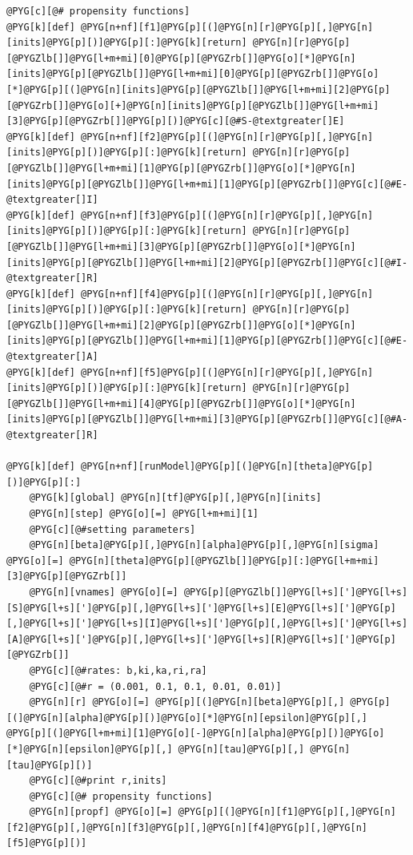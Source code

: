 \documentclass[a4paper,10pt,english]{manual}
\begin{document}
\begin{Verbatim}[commandchars=@\[\]]
@PYG[c][@# propensity functions]
@PYG[k][def] @PYG[n+nf][f1]@PYG[p][(]@PYG[n][r]@PYG[p][,]@PYG[n][inits]@PYG[p][)]@PYG[p][:]@PYG[k][return] @PYG[n][r]@PYG[p][@PYGZlb[]]@PYG[l+m+mi][0]@PYG[p][@PYGZrb[]]@PYG[o][*]@PYG[n][inits]@PYG[p][@PYGZlb[]]@PYG[l+m+mi][0]@PYG[p][@PYGZrb[]]@PYG[o][*]@PYG[p][(]@PYG[n][inits]@PYG[p][@PYGZlb[]]@PYG[l+m+mi][2]@PYG[p][@PYGZrb[]]@PYG[o][+]@PYG[n][inits]@PYG[p][@PYGZlb[]]@PYG[l+m+mi][3]@PYG[p][@PYGZrb[]]@PYG[p][)]@PYG[c][@#S-@textgreater[]E]
@PYG[k][def] @PYG[n+nf][f2]@PYG[p][(]@PYG[n][r]@PYG[p][,]@PYG[n][inits]@PYG[p][)]@PYG[p][:]@PYG[k][return] @PYG[n][r]@PYG[p][@PYGZlb[]]@PYG[l+m+mi][1]@PYG[p][@PYGZrb[]]@PYG[o][*]@PYG[n][inits]@PYG[p][@PYGZlb[]]@PYG[l+m+mi][1]@PYG[p][@PYGZrb[]]@PYG[c][@#E-@textgreater[]I]
@PYG[k][def] @PYG[n+nf][f3]@PYG[p][(]@PYG[n][r]@PYG[p][,]@PYG[n][inits]@PYG[p][)]@PYG[p][:]@PYG[k][return] @PYG[n][r]@PYG[p][@PYGZlb[]]@PYG[l+m+mi][3]@PYG[p][@PYGZrb[]]@PYG[o][*]@PYG[n][inits]@PYG[p][@PYGZlb[]]@PYG[l+m+mi][2]@PYG[p][@PYGZrb[]]@PYG[c][@#I-@textgreater[]R]
@PYG[k][def] @PYG[n+nf][f4]@PYG[p][(]@PYG[n][r]@PYG[p][,]@PYG[n][inits]@PYG[p][)]@PYG[p][:]@PYG[k][return] @PYG[n][r]@PYG[p][@PYGZlb[]]@PYG[l+m+mi][2]@PYG[p][@PYGZrb[]]@PYG[o][*]@PYG[n][inits]@PYG[p][@PYGZlb[]]@PYG[l+m+mi][1]@PYG[p][@PYGZrb[]]@PYG[c][@#E-@textgreater[]A]
@PYG[k][def] @PYG[n+nf][f5]@PYG[p][(]@PYG[n][r]@PYG[p][,]@PYG[n][inits]@PYG[p][)]@PYG[p][:]@PYG[k][return] @PYG[n][r]@PYG[p][@PYGZlb[]]@PYG[l+m+mi][4]@PYG[p][@PYGZrb[]]@PYG[o][*]@PYG[n][inits]@PYG[p][@PYGZlb[]]@PYG[l+m+mi][3]@PYG[p][@PYGZrb[]]@PYG[c][@#A-@textgreater[]R]

@PYG[k][def] @PYG[n+nf][runModel]@PYG[p][(]@PYG[n][theta]@PYG[p][)]@PYG[p][:]
    @PYG[k][global] @PYG[n][tf]@PYG[p][,]@PYG[n][inits]
    @PYG[n][step] @PYG[o][=] @PYG[l+m+mi][1]
    @PYG[c][@#setting parameters]
    @PYG[n][beta]@PYG[p][,]@PYG[n][alpha]@PYG[p][,]@PYG[n][sigma] @PYG[o][=] @PYG[n][theta]@PYG[p][@PYGZlb[]]@PYG[p][:]@PYG[l+m+mi][3]@PYG[p][@PYGZrb[]]
    @PYG[n][vnames] @PYG[o][=] @PYG[p][@PYGZlb[]]@PYG[l+s][']@PYG[l+s][S]@PYG[l+s][']@PYG[p][,]@PYG[l+s][']@PYG[l+s][E]@PYG[l+s][']@PYG[p][,]@PYG[l+s][']@PYG[l+s][I]@PYG[l+s][']@PYG[p][,]@PYG[l+s][']@PYG[l+s][A]@PYG[l+s][']@PYG[p][,]@PYG[l+s][']@PYG[l+s][R]@PYG[l+s][']@PYG[p][@PYGZrb[]]
    @PYG[c][@#rates: b,ki,ka,ri,ra]
    @PYG[c][@#r = (0.001, 0.1, 0.1, 0.01, 0.01)]
    @PYG[n][r] @PYG[o][=] @PYG[p][(]@PYG[n][beta]@PYG[p][,] @PYG[p][(]@PYG[n][alpha]@PYG[p][)]@PYG[o][*]@PYG[n][epsilon]@PYG[p][,] @PYG[p][(]@PYG[l+m+mi][1]@PYG[o][-]@PYG[n][alpha]@PYG[p][)]@PYG[o][*]@PYG[n][epsilon]@PYG[p][,] @PYG[n][tau]@PYG[p][,] @PYG[n][tau]@PYG[p][)]
    @PYG[c][@#print r,inits]
    @PYG[c][@# propensity functions]
    @PYG[n][propf] @PYG[o][=] @PYG[p][(]@PYG[n][f1]@PYG[p][,]@PYG[n][f2]@PYG[p][,]@PYG[n][f3]@PYG[p][,]@PYG[n][f4]@PYG[p][,]@PYG[n][f5]@PYG[p][)]


\end{Verbatim}
\end{document}
